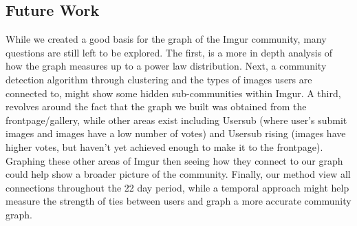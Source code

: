 \documentclass{article}
\begin{document}
\subsection{Future Work}
\par While we created a good basis for the graph of the Imgur community, many questions are still left to be explored. The first, is a more in depth analysis of how the graph measures up to a power law distribution. Next, a community detection algorithm through clustering and the types of images users are connected to, might show some hidden sub-communities within Imgur. A third, revolves around the fact that the graph we built was obtained from the frontpage/gallery, while other areas exist including Usersub (where user's submit images and images have a low number of votes) and Usersub rising (images have higher votes, but haven't yet achieved enough to make it to the frontpage). Graphing these other areas of Imgur then seeing how they connect to our graph could help show a broader picture of the community. Finally, 
our method view all connections throughout the 22 day period, while a temporal approach might help measure the strength of ties between users and graph a more accurate community graph. 

\medskip


\end{document}
